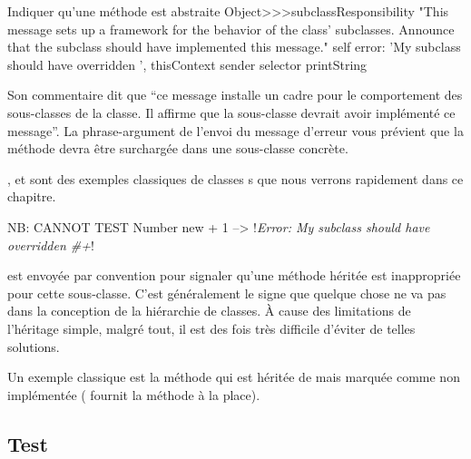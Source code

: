 \documentclass[a4paper,10pt,twoside]{book}
\begin{document}
\begin{method}{Indiquer qu'une m\'ethode est abstraite}
Object>>>subclassResponsibility
    "This message sets up a framework for the behavior of the class' subclasses.
    Announce that the subclass should have implemented this message."
    self error: 'My subclass should have overridden ', thisContext sender selector printString
\end{method}

Son commentaire dit que ``ce message installe un cadre pour le
comportement des sous-classes de la classe. Il affirme que la sous-classe
devrait avoir impl\'ement\'e ce message''. La phrase-argument de
l'envoi du message d'erreur  vous pr\'evient que la
m\'ethode devra \^etre surcharg\'ee dans une sous-classe concr\`ete.

,  et  sont des exemples classiques de  classes s que nous verrons rapidement dans ce chapitre.

\begin{code}{NB: CANNOT TEST}
Number new + 1 --> !\emph{Error: My subclass should have overridden \#+}!
\end{code}

 est envoy\'ee par convention pour signaler qu'une m\'ethode h\'erit\'ee est inappropri\'ee pour cette sous-classe. C'est g\'en\'eralement le signe que quelque chose ne va pas dans la conception de la hi\'erarchie de classes. \`A cause des limitations de l'h\'eritage simple, malgr\'e tout, il est des fois tr\`es difficile d'\'eviter de telles solutions.

Un exemple classique est la m\'ethode  qui est h\'erit\'ee de  mais marqu\'ee comme non impl\'ement\'ee ( fournit la m\'ethode  \`a la place).



\subsection{Test}
\end{document}
